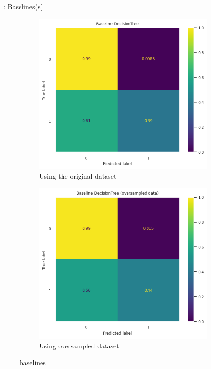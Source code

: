 \begin{frame}{\subsecname\ : Baselines(s)}
\begin{figure}
    \centering
    \begin{subfigure}[c]{0.4\textwidth}
        \includegraphics[width=\textwidth]{images/models/DT_base.png}
        \caption{Using the original dataset}
        \label{fig:DT_base}
    \end{subfigure}
    \begin{subfigure}[c]{0.4\textwidth}
        \includegraphics[width=\textwidth]{images/models/DT_base_overs.png}
        \caption{Using oversampled dataset}
        \label{fig:DT_base_overs}
    \end{subfigure}
    \caption{ baselines}
    \label{fig:DT_bases}
\end{figure}
\end{frame}

